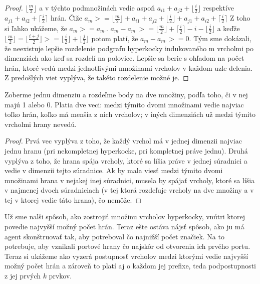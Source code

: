 \begin{proof}
$\lfloor \frac{m}{2} \rfloor$ a v týchto podmnožinách vedie aspoň $a_{i1} +
a_{j2} + \lfloor \frac{i}{2} \rfloor $ respektíve $a_{j1} + a_{i2} + 
\lceil \frac{i}{2} \rceil$ hrán.
Čiže $a_{m} >= \lfloor \frac{m}{2} \rfloor + a_{i1} +
a_{j2} + \lfloor \frac{i}{2} \rfloor + a_{j1} + a_{i2} + 
\lceil \frac{i}{2} \rceil$
Z toho si ľahko ukážeme, že $a_{m} >= a_{m^{,}}$.
 $a_{m} - a_{m^{,}} >= \lfloor \frac{m}{2}\rfloor + \lceil \frac{i}{2}
\rceil - i - \lfloor \frac{j}{2} \rfloor$ a keďže 
$\lfloor \frac{m}{2}\rfloor = \lfloor \frac{i+j}{2}\rfloor >= \lfloor \frac{i}{2} \rfloor + \lfloor \frac{j}{2} \rfloor$
potom platí, že $a_{m} - a_{m^{,}} >=0$. Tým sme dokázali, že neexistuje
lepšie rozdelenie podgrafu hyperkocky indukovaného m vrcholmi po dimenziách 
ako keď sa rozdelí
na polovice. Lepšie sa berie s ohľadom na počet hrán, ktoré vedú medzi
jednotlivými množinami vrcholov v každom uzle delenia.
Z predošlých viet vyplýva, že takéto rozdelenie možné je.
\end{proof}

\begin{lem}
\label{rozdel}
Zoberme jednu dimenziu a rozdeľme body na dve množiny, podľa toho,
či v nej majú 1 alebo 0. Platia dve veci: medzi týmito dvomi množinami vedie
najviac toľko hrán, koľko má menšia z nich vrcholov; v iných dimenziách už
medzi týmito vrcholmi hrany nevedú.
\end{lem}
\begin{proof}
Prvá vec vyplýva z toho, že každý vrchol má v jednej dimenzii najviac jednu
hranu (pri nekompletnej hyperkocke, pri kompletnej práve jednu).
Druhá vyplýva z toho, že hrana spája vrcholy, ktoré sa líšia práve v jednej
súradnici a vedie v dimenzii tejto súradnice. Ak by mala viesť medzi týmito
dvomi množinami hrana v nejakej inej súradnici, musela by spájať vrcholy,
ktoré sa líšia v najmenej dvoch súradniciach (v tej ktorá rozdeľuje vrcholy
na dve množiny a v tej v ktorej vedie táto hrana), čo nemôže.
\end{proof}

Už sme nalši spôsob, ako zostrojiť množinu vrcholov hyperkocky, vnútri ktorej
povedie najvyšší možný počet hrán. Teraz ešte ostáva nájsť spôsob, ako ju má
agent skonštruovať tak, aby potreboval čo najnižší počet značiek. Na to
potrebuje, aby vznikali portové hrany čo najskôr od otvorenia ich prvého
portu. Teraz si ukážeme ako vyzerá postupnosť vrcholov medzi ktorými vedie
najvyšší možný počet hrán a zároveň to platí aj o každom jej prefixe, teda
podpostupnosti z jej prvých $k$ prvkov.

